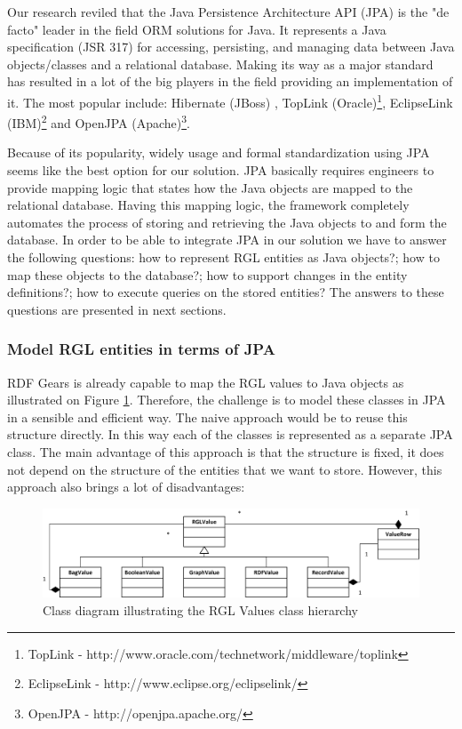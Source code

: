 Our research reviled that the Java Persistence Architecture API (JPA) is the "de facto" leader in the field ORM solutions for Java. It represents a Java specification (JSR 317) for accessing, persisting, and managing data between Java objects/classes and a relational database. Making its way as a major standard has resulted in a lot of the big players in the field providing an implementation of it. The most popular include: Hibernate (JBoss) \cite{linwood2010beginning}, TopLink (Oracle)\footnote{TopLink - http://www.oracle.com/technetwork/middleware/toplink}, EclipseLink (IBM)\footnote{EclipseLink - http://www.eclipse.org/eclipselink/} and OpenJPA (Apache)\footnote{OpenJPA - http://openjpa.apache.org/}. 

Because of its popularity, widely usage and formal standardization using JPA seems like the best option for our solution. JPA basically requires engineers to provide mapping logic that states how the Java objects are mapped to the relational database. Having this mapping logic, the framework completely automates the process of storing and retrieving the Java objects to and form the database. In order to be able to integrate JPA in our solution we have to answer the following questions: how to represent RGL entities as Java objects?; how to map these objects to the database?; how to support changes in the entity definitions?; how to execute queries on the stored entities? The answers to these questions are presented in next sections.


\subsubsection{Model RGL entities in terms of JPA}

RDF Gears is already capable to map the RGL values to Java objects as illustrated on Figure \ref{fig_rglValuesClassDiag}. Therefore, the challenge is to model these classes in JPA in a sensible and efficient way. The naive approach would be to reuse this structure directly. In this way each of the classes is represented as a separate JPA class. The main advantage of this approach is that the structure is fixed, it does not depend on the structure of the entities that we want to store. However, this approach also brings a lot of disadvantages: 

\begin{figure}[h!]
  \centering
  	\includegraphics[scale=0.8]{storage/diagrams/RGLValues.png}
  \caption{Class diagram illustrating the RGL Values class hierarchy}
  \label{fig_rglValuesClassDiag}
\end{figure}

